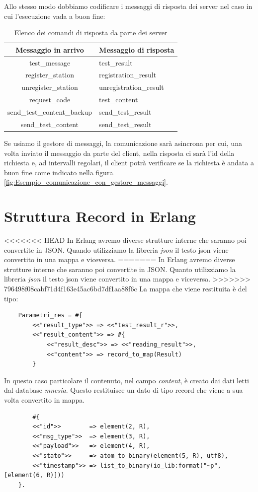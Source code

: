 Allo stesso modo dobbiamo codificare i messaggi di risposta dei server nel caso in cui l'esecuzione vada a buon fine:
\begin{table}[h]
	\centering %
	\caption{Elenco dei comandi di risposta da parte dei server}
	\begin{tabular}{|c|l|}
		\hline
		\textbf{Messaggio in arrivo} & \textbf{Messaggio di risposta} \\
		\hline
		test\_message & test\_result\\
		\hline
		register\_station & registration\_result \\
		\hline
		unregister\_station & unregistration\_result \\
		\hline
		request\_code & test\_content \\
		\hline
		send\_test\_content\_backup & send\_test\_result \\
		\hline
		send\_test\_content & send\_test\_result \\
		\hline
	\end{tabular}
	\label{tab:tabella_comandi}
\end{table}

Se usiamo il gestore di messaggi, la comunicazione sar\`a asincrona per cui, una volta inviato il messaggio da parte del client, nella risposta ci sar\`a l'id della richiesta e, ad intervalli regolari, il client potr\`a verificare se la richiesta \`e andata a buon fine come indicato nella figura \ref{fig:Esempio_comunicazione_con_gestore_messaggi}.

\section{Struttura Record in Erlang}
<<<<<<< HEAD
In Erlang avremo diverse strutture interne che saranno poi convertite in JSON. Quando utilizziamo la libreria \textit{json} il testo json viene convertito in una mappa e viceversa.
=======
In Erlang avremo diverse strutture interne che saranno poi convertite in JSON. Quanto utilizziamo la libreria \textit{json} il testo json viene convertito in una mappa e viceversa.
>>>>>>> 796498f08cabf71d4f163e45ac6bd7df1aa88f6c
La mappa che viene restituita \`e del tipo:

\begin{verbatim}
	Parametri_res = #{
		<<"result_type">> => <<"test_result_r">>,
		<<"result_content">> => #{
			<<"result_desc">> => <<"reading_result">>,
			<<"content">> => record_to_map(Result)
		} 		
\end{verbatim}

In questo caso particolare il contenuto, nel campo \textit{content}, \`e creato dai dati letti dal database \textit{mnesia}. Questo restituisce un dato di tipo record che viene a sua volta convertito in mappa.

\begin{verbatim}
	    #{
		<<"id">>        => element(2, R),
		<<"msg_type">>  => element(3, R),
		<<"payload">>   => element(4, R),
		<<"stato">>     => atom_to_binary(element(5, R), utf8),
		<<"timestamp">> => list_to_binary(io_lib:format("~p", [element(6, R)]))
	}.
\end{verbatim}
